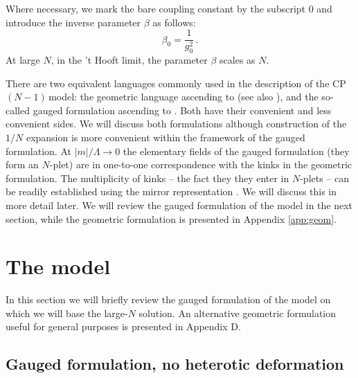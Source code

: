 \documentclass[epsfig,12pt]{article}
\def\beq{\begin{equation}}
\def\eeq{\end{equation}}
\newcommand{\cpn}{CP$(N-1)\,$}
\def\beq{\begin{equation}}
\def\eeq{\end{equation}}
\begin{document}
Where necessary, we mark the bare coupling constant by the subscript 0 and introduce
the inverse parameter $\beta$ as follows:
\beq
\beta_0 = \frac{1}{g_0^2}\,.
\eeq
At large $N$, in the 't Hooft limit,  the parameter $\beta$ scales as $N$.

There are two equivalent languages commonly used in the description of the \cpn model:
the geometric language ascending to \cite{Bruno} (see also \cite{rev2}), and the
so-called gauged formulation ascending to \cite{W79,W93}. Both have their convenient and less convenient sides.
We will discuss both formulations although construction of the $1/N$ expansion is
more convenient within the framework of the gauged formulation. At $|m|/\Lambda \to 0$
the elementary fields of the
gauged formulation (they form an  $N$-plet) are in one-to-one correspondence with the kinks in the geometric formulation.
The multiplicity of kinks -- the fact they they enter in $N$-plets --
can be readily established \cite{adam} using the mirror representation \cite{MR1}. We will discuss this in more detail later. We will review the gauged formulation 
of the model in the next section, while the geometric formulation is presented in 
Appendix \ref{app:geom}.

\section{The model}
\label{mmod}
\setcounter{equation}{0}

In this section we will briefly review the gauged formulation of
the model on which we will base the large-$N$ solution. An alternative geometric formulation
useful for general purposes 
is presented in Appendix D.

\subsection{Gauged formulation, no heterotic deformation}
\end{document}
